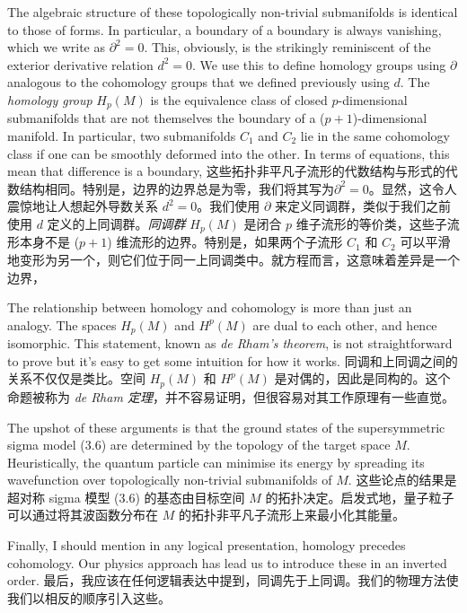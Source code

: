 \documentclass{article}
\begin{document}
\begin{paracol}{2}
The algebraic structure of these topologically non-trivial submanifolds is identical to those of forms. In particular, a boundary of a boundary is always vanishing, which we write as $\partial^2 = 0$. This, obviously, is the strikingly reminiscent of the exterior derivative relation $d^2 = 0$. We use this to define homology groups using $\partial$ analogous to the cohomology groups that we defined previously using $d$. The \textit{homology group} $H_p(M)$ is the equivalence class of closed $p$-dimensional submanifolds that are not themselves the boundary of a ($p+1$)-dimensional manifold. In particular, two submanifolds $C_1$ and $C_2$ lie in the same cohomology class if one can be smoothly deformed into the other. In terms of equations, this mean that difference is a boundary,
\switchcolumn
这些拓扑非平凡子流形的代数结构与形式的代数结构相同。特别是，边界的边界总是为零，我们将其写为$\partial^2 = 0$。显然，这令人震惊地让人想起外导数关系 $d^2 = 0$。我们使用 $\partial$ 来定义同调群，类似于我们之前使用 $d$ 定义的上同调群。\textit{同调群} $H_p(M)$ 是闭合 $p$ 维子流形的等价类，这些子流形本身不是 ($p+1$) 维流形的边界。特别是，如果两个子流形 $C_1$ 和 $C_2$ 可以平滑地变形为另一个，则它们位于同一上同调类中。就方程而言，这意味着差异是一个边界，
\switchcolumn*

The relationship between homology and cohomology is more than just an analogy. The spaces $H_p(M)$ and $H^p(M)$ are dual to each other, and hence isomorphic. This statement, known as \textit{de Rham’s theorem}, is not straightforward to prove but it’s easy to get some intuition for how it works.
\switchcolumn
同调和上同调之间的关系不仅仅是类比。空间 $H_p(M)$ 和 $H^p(M)$ 是对偶的，因此是同构的。这个命题被称为 \textit{de Rham 定理}，并不容易证明，但很容易对其工作原理有一些直觉。
\switchcolumn*

The upshot of these arguments is that the ground states of the supersymmetric sigma model (3.6) are determined by the topology of the target space $M$. Heuristically, the quantum particle can minimise its energy by spreading its wavefunction over topologically non-trivial submanifolds of $M$.
\switchcolumn
这些论点的结果是超对称 sigma 模型 (3.6) 的基态由目标空间 $M$ 的拓扑决定。启发式地，量子粒子可以通过将其波函数分布在 $M$ 的拓扑非平凡子流形上来最小化其能量。
\switchcolumn*

Finally, I should mention in any logical presentation, homology precedes cohomology. Our physics approach has lead us to introduce these in an inverted order.
\switchcolumn
最后，我应该在任何逻辑表达中提到，同调先于上同调。我们的物理方法使我们以相反的顺序引入这些。
\switchcolumn*


\end{paracol}
\end{document}
